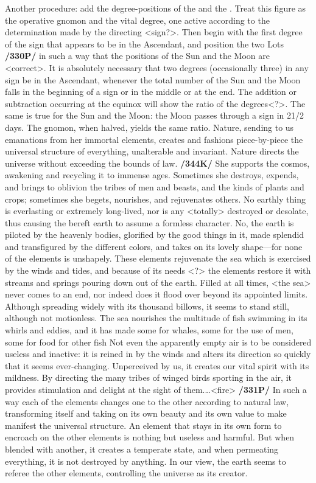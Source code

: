 Another procedure: add the degree-positions of the \Sun\xspace and the \Moon. Treat this figure as the operative gnomon and the vital degree, one active according to the determination made by the directing <sign?>. Then begin with the first degree of the sign that appears to be in the Ascendant, and position the two Lots \textbf{/330P/} in such a way that the positions of the Sun and the Moon are <correct>. It is absolutely necessary that two degrees (occasionally three) in any sign be in the Ascendant, whenever the total number
of the Sun and the Moon falls in the beginning of a sign or in the middle or at the end. The addition or subtraction occurring at the equinox will show the ratio of the degrees<?>. The same is true for the Sun and the Moon: the Moon passes through a sign in 21/2 days. The gnomon, when halved, yields the same ratio. Nature, sending to us emanations from her immortal elements, creates and fashions piece-by-piece the universal structure of everything, unalterable and invariant. Nature directs the universe without exceeding the bounds of law. \textbf{/344K/} She supports the cosmos, awakening and recycling it to immense ages. Sometimes she destroys, expends, and brings to oblivion the tribes of men and beasts, and the kinds of plants and crops; sometimes she begets, nourishes, and rejuvenates others. No earthly thing is everlasting or extremely long-lived, nor is any <totally> destroyed or desolate, thus causing the bereft earth to assume a formless character. No, the earth is piloted by the heavenly bodies, glorified by the good things in it, made splendid and transfigured by the different colors, and takes on its lovely shape—for none of the elements is unshapely. These elements rejuvenate the sea which is exercised by the winds and tides, and because of its needs <?> the elements restore it with streams and springs pouring down out of the earth. Filled at all times, <the sea> never comes to an end, nor indeed does it flood over beyond its appointed limits. Although spreading widely with its thousand billows, it seems to stand still, although not motionless. The sea nourishes the multitude of fish swimming in its whirls and eddies, and it has made some for whales, some for the use of men, some for food for other fish Not even the apparently empty air is to be considered useless and inactive: it is reined in by the winds and alters its direction so quickly that it seems ever-changing. Unperceived by us, it creates our vital spirit with its mildness. By directing the many tribes of winged birds sporting in the air, it provides stimulation and delight at the sight of them.…<fire>
\textbf{/331P/} In such a way each of the elements changes one to the other according to natural law, transforming itself and taking on its own beauty and its own value to make manifest the universal structure. An element that stays in its own form to encroach on the other elements is nothing but useless and harmful. But when blended with another, it creates a temperate state, and when permeating everything, it is not destroyed by anything. In our view, the earth seems to referee the other elements, controlling the universe as its creator.

\newpage
